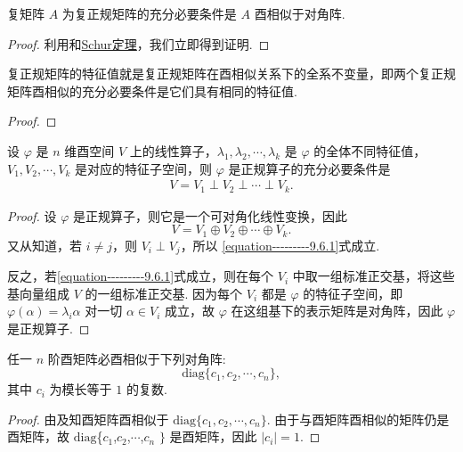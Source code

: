 \documentclass[../../main.tex]{subfiles}%
\begin{document}
\begin{theorem}\label{theorem:复正规矩阵等价于酉相似于对角阵的矩阵}
复矩阵 $A$ 为复正规矩阵的充分必要条件是 $A$ 酉相似于对角阵.
\end{theorem}
\begin{proof}
利用和\hyperref[theorem:Schur(舒尔)定理]{Schur定理}，我们立即得到证明.
\end{proof}

\begin{theorem}\label{theorem:复正规矩阵的特征值就是复正规矩阵在酉相似关系下的全系不变量}
复正规矩阵的特征值就是复正规矩阵在酉相似关系下的全系不变量，即两个复正规矩阵酉相似的充分必要条件是它们具有相同的特征值.
\end{theorem}
\begin{proof}

\end{proof}

\begin{proposition}
设 $\varphi$ 是 $n$ 维酉空间 $V$ 上的线性算子，$\lambda_1,\lambda_2,\cdots,\lambda_k$ 是 $\varphi$ 的全体不同特征值，$V_1,V_2,\cdots,V_k$ 是对应的特征子空间，则 $\varphi$ 是正规算子的充分必要条件是
\begin{align}\label{equation---------9.6.1}
V = V_1 \perp V_2 \perp \cdots \perp V_k. 
\end{align}
\end{proposition}
\begin{proof}
设 $\varphi$ 是正规算子，则它是一个可对角化线性变换，因此
\[
V = V_1 \oplus V_2 \oplus \cdots \oplus V_k.
\]
又从知道，若 $i \neq j$，则 $V_i \perp V_j$，所以 \eqref{equation---------9.6.1}式成立.

反之，若\eqref{equation---------9.6.1}式成立，则在每个 $V_i$ 中取一组标准正交基，将这些基向量组成 $V$ 的一组标准正交基. 因为每个 $V_i$ 都是 $\varphi$ 的特征子空间，即 $\varphi(\alpha) = \lambda_i\alpha$ 对一切 $\alpha \in V_i$ 成立，故 $\varphi$ 在这组基下的表示矩阵是对角阵，因此 $\varphi$ 是正规算子. 
\end{proof}

\begin{theorem}
任一 $n$ 阶酉矩阵必酉相似于下列对角阵:
\[
\mathrm{diag}\{c_1,c_2,\cdots,c_n\},
\]
其中 $c_i$ 为模长等于 $1$ 的复数.
\end{theorem}
\begin{proof}
由及知酉矩阵酉相似于 $\mathrm{diag}\{c_1,c_2,\cdots,c_n\}$. 由于与酉矩阵酉相似的矩阵仍是酉矩阵，故 $\mathrm{diag}$\{$c_1$,$c_2$,$\cdots$,$c_n$ $\}$ 是酉矩阵，因此 $|c_i| = 1$.
\end{proof}
\end{document}
